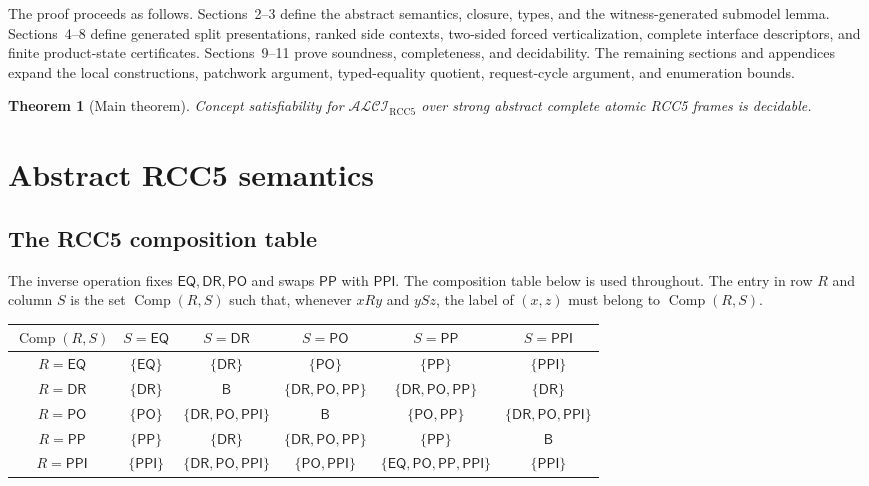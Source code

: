 \documentclass[11pt]{article}
\newtheorem{theorem}{Theorem}[section]
\newcommand{\Logic}{\mathcal{ALCI}_{\mathrm{RCC5}}}
\newcommand{\Base}{\mathsf B}
\newcommand{\EQ}{\mathsf{EQ}}
\newcommand{\DR}{\mathsf{DR}}
\newcommand{\PO}{\mathsf{PO}}
\newcommand{\PP}{\mathsf{PP}}
\newcommand{\PPI}{\mathsf{PPI}}
\newcommand{\comp}{\operatorname{Comp}}
\begin{document}
The proof proceeds as follows.  Sections~2--3 define the abstract semantics, closure, types, and the witness-generated submodel lemma.  Sections~4--8 define generated split presentations, ranked side contexts, two-sided forced verticalization, complete interface descriptors, and finite product-state certificates.  Sections~9--11 prove soundness, completeness, and decidability.  The remaining sections and appendices expand the local constructions, patchwork argument, typed-equality quotient, request-cycle argument, and enumeration bounds.

\begin{theorem}[Main theorem]\label{thm:main}
Concept satisfiability for $\Logic$ over strong abstract complete atomic RCC5 frames is decidable.
\end{theorem}
\section{Abstract RCC5 semantics}

\subsection{The RCC5 composition table}

The inverse operation fixes $\EQ,\DR,\PO$ and swaps $\PP$ with $\PPI$.  The composition table below is used throughout.  The entry in row $R$ and column $S$ is the set $\comp(R,S)$ such that, whenever $xRy$ and $ySz$, the label of $(x,z)$ must belong to $\comp(R,S)$.

\begin{center}
\renewcommand{\arraystretch}{1.18}
\begin{tabular}{c|ccccc}
\toprule
$\comp(R,S)$ & $S=\EQ$ & $S=\DR$ & $S=\PO$ & $S=\PP$ & $S=\PPI$ \\
\midrule
$R=\EQ$  & $\{\EQ\}$ & $\{\DR\}$ & $\{\PO\}$ & $\{\PP\}$ & $\{\PPI\}$ \\
$R=\DR$  & $\{\DR\}$ & $\Base$ & $\{\DR,\PO,\PP\}$ & $\{\DR,\PO,\PP\}$ & $\{\DR\}$ \\
$R=\PO$  & $\{\PO\}$ & $\{\DR,\PO,\PPI\}$ & $\Base$ & $\{\PO,\PP\}$ & $\{\DR,\PO,\PPI\}$ \\
$R=\PP$  & $\{\PP\}$ & $\{\DR\}$ & $\{\DR,\PO,\PP\}$ & $\{\PP\}$ & $\Base$ \\
$R=\PPI$ & $\{\PPI\}$ & $\{\DR,\PO,\PPI\}$ & $\{\PO,\PPI\}$ & $\{\EQ,\PO,\PP,\PPI\}$ & $\{\PPI\}$ \\
\bottomrule
\end{tabular}
\end{center}
\end{document}
